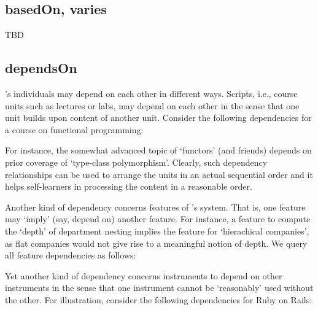 
\subsection{basedOn, varies}

TBD

\begin{comment}
Contributions based on other contributions
Contributions varying other contributions
\end{comment}


\subsection{dependsOn}

\solasote{}'s individuals may depend on each other in different
ways. Scripts, i.e., course units such as lectures or labs, may depend
on each other in the sense that one unit builds upon content of
another unit. Consider the following dependencies for a course on
functional programming:


\noindent
For instance, the somewhat advanced topic of `functors' (and friends)
depends on prior coverage of `type-class polymorphism'. Clearly, such
dependency relationships can be used to arrange the units in an actual
sequential order and it helps self-learners in processing the content
in a reasonable order.

Another kind of dependency concerns features of \ooo{}'s system. That
is, one feature may `imply' (say, depend on) another feature. For
instance, a feature to compute the `depth' of department nesting implies
the feature for `hierachical companies', as flat companies would not
give rise to a meaningful notion of depth. We query all feature
dependencies as follows:



\noindent
Yet another kind of dependency concerns instruments to depend on other
instruments in the sense that one instrument cannot be `reasonably'
used without the other. For illustration, consider the following
dependencies for Ruby on Rails:


